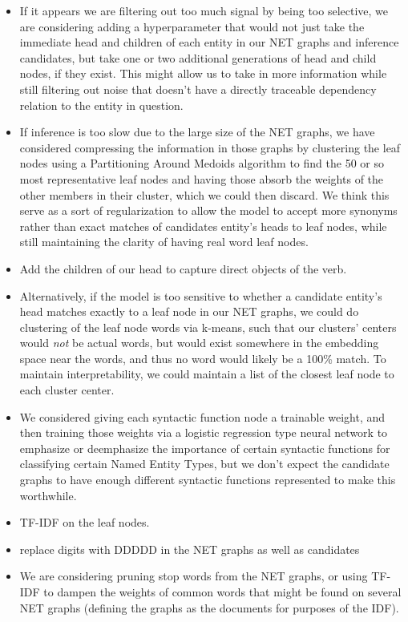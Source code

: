 \documentclass[11pt,a4paper]{article}
\begin{document}
\begin{itemize}

\item If it appears we are filtering out too much signal by being too selective, we are considering adding a hyperparameter that would not just take the immediate head and children of each entity in our NET graphs and inference candidates, but take one or two additional generations of head and child nodes, if they exist. This might allow us to take in more information while still filtering out noise that doesn't have a directly traceable dependency relation to the entity in question.

\item If inference is too slow due to the large size of the NET graphs, we have considered compressing the information in those graphs by clustering the leaf nodes using a Partitioning Around Medoids algorithm to find the 50 or so most representative leaf nodes and having those absorb the weights of the other members in their cluster, which we could then discard. We think this serve as a sort of regularization to allow the model to accept more synonyms rather than exact matches of candidates entity's heads to leaf nodes, while still maintaining the clarity of having real word leaf nodes.

\item Add the children of our head to capture direct objects of the verb.

\item Alternatively, if the model is too sensitive to whether a candidate entity's head matches exactly to a leaf node in our NET graphs, we could do clustering of the leaf node words via k-means, such that our clusters' centers would \textit{not} be actual words, but would exist somewhere in the embedding space near the words, and thus no word would likely be a 100\% match. To maintain interpretability, we could maintain a list of the closest leaf node to each cluster center.

\item We considered giving each syntactic function node a trainable weight, and then training those weights via a logistic regression type neural network to emphasize or deemphasize the importance of certain syntactic functions for classifying certain Named Entity Types, but we don't expect the candidate graphs to have enough different syntactic functions represented to make this worthwhile.

\item TF-IDF on the leaf nodes.

\item replace digits with DDDDD in the NET graphs as well as candidates

\item We are considering pruning stop words from the NET graphs, or using TF-IDF to dampen the weights of common words that might be found on several NET graphs (defining the graphs as the documents for purposes of the IDF).

\end{itemize}
\end{document}
